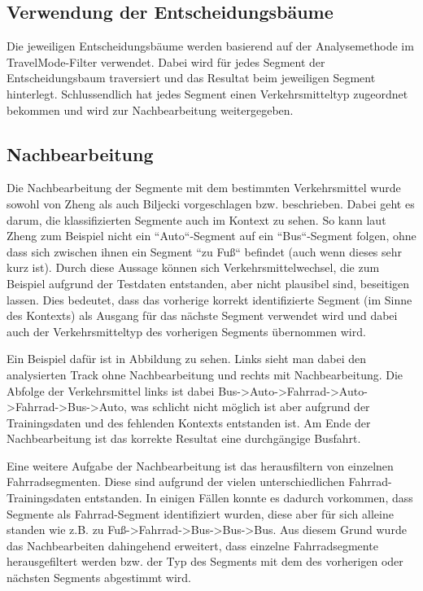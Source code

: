 \subsection{Verwendung der Entscheidungsbäume}
\label{entscheidungsbaum_verwendung}
Die jeweiligen Entscheidungsbäume werden basierend auf der Analysemethode im TravelMode-Filter verwendet. Dabei wird für jedes Segment der Entscheidungsbaum traversiert und das Resultat beim jeweiligen Segment hinterlegt. Schlussendlich hat jedes Segment einen Verkehrsmitteltyp zugeordnet bekommen und wird zur Nachbearbeitung weitergegeben.

\subsection{Nachbearbeitung}
\label{nachbearbeitung}
Die Nachbearbeitung der Segmente mit dem bestimmten Verkehrsmittel wurde sowohl von Zheng \cite{zheng_understanding_2010} als auch Biljecki \cite{biljecki_transportation_2013} vorgeschlagen bzw. beschrieben. Dabei geht es darum, die klassifizierten Segmente auch im Kontext zu sehen. So kann laut Zheng \cite{zheng_understanding_2010} zum Beispiel nicht ein ``Auto``-Segment auf ein ``Bus``-Segment folgen, ohne dass sich zwischen ihnen ein Segment ``zu Fuß`` befindet (auch wenn dieses sehr kurz ist). Durch diese Aussage können sich Verkehrsmittelwechsel, die zum Beispiel aufgrund der Testdaten entstanden, aber nicht plausibel sind, beseitigen lassen. Dies bedeutet, dass das vorherige korrekt identifizierte Segment (im Sinne des Kontexts) als Ausgang für das nächste Segment verwendet wird und dabei auch der Verkehrsmitteltyp des vorherigen Segments übernommen wird. 

Ein Beispiel dafür ist in Abbildung  zu sehen. Links sieht man dabei den analysierten Track ohne Nachbearbeitung und rechts mit Nachbearbeitung. Die Abfolge der Verkehrsmittel links ist dabei Bus->Auto->Fahrrad->Auto->Fahrrad->Bus->Auto, was schlicht nicht möglich ist aber aufgrund der Trainingsdaten und des fehlenden Kontexts entstanden ist. Am Ende der Nachbearbeitung ist das korrekte Resultat eine durchgängige Busfahrt. 


Eine weitere Aufgabe der Nachbearbeitung ist das herausfiltern von einzelnen Fahrradsegmenten. Diese sind aufgrund der vielen unterschiedlichen Fahrrad-Trainingsdaten entstanden. In einigen Fällen konnte es dadurch vorkommen, dass Segmente als Fahrrad-Segment identifiziert wurden, diese aber für sich alleine standen wie z.B. zu Fuß->Fahrrad->Bus->Bus->Bus. Aus diesem Grund wurde das Nachbearbeiten dahingehend erweitert, dass einzelne Fahrradsegmente herausgefiltert werden bzw. der Typ des Segments mit dem des vorherigen oder nächsten Segments abgestimmt wird.
\clearpage


